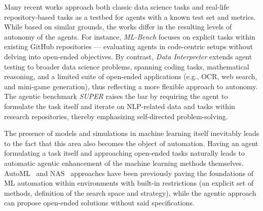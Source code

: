 
Many recent works approach both classic data science tasks and real-life repository-based tasks as a testbed for agents with a known test set and metrics.
While based on similar grounds, the works differ in the resulting levels of autonomy of the agents. For instance, \textit{ML-Bench} \citep{tangMLBenchEvaluatingLarge2024} focuses on explicit tasks within existing GitHub repositories — evaluating agents in code-centric setups without delving into open-ended objectives. By contrast, \textit{Data Interpreter} \citep{hongDataInterpreterLLM2024} extends agent testing to broader data science problems, spanning coding tasks, mathematical reasoning, and a limited suite of open-ended applications (e.g., OCR, web search, and mini-game generation), thus reflecting a more flexible approach to autonomy. The agentic benchmark \textit{SUPER} \citep{boginSUPEREvaluatingAgents2024} raises the bar by requiring the agent to formulate the task itself and iterate on NLP-related data and tasks within research repositories, thereby emphasizing self-directed problem-solving.



The presence of models and simulations in machine learning itself inevitably leads to the fact that this area also becomes the object of automation.
Having an agent formulating a task itself and approaching open-ended tasks naturally leads to automatic agentic enhancement of the machine learning methods themselves. AutoML~\citep{eggensperger2019pitfalls,lindauer2020best,tornede2023automl} and NAS~\citep{elsken2019neural,nasir2024llmatic} approaches have been previously paving the foundations of ML automation within environments with built-in restrictions (an explicit set of methods, definition of the search space and strategy), while the agentic approach can propose open-ended solutions without said specifications.

